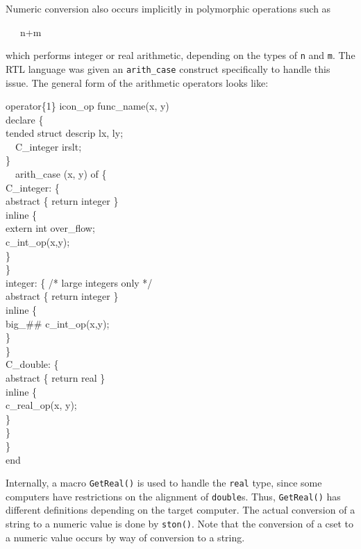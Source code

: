Numeric conversion also occurs implicitly in polymorphic operations such as

{\ttfamily\mdseries
\ \ \ n+m}

\noindent which performs integer or real arithmetic, depending on the
types of \texttt{n} and \texttt{m}. The RTL language was given an
\texttt{arith\_case} construct specifically to handle this issue. The
general form of the arithmetic operators looks like:


\begin{iconcode}
\>operator\{1\} icon\_op func\_name(x, y)\\
\>\>declare \{\\
\>\>\>tended struct descrip lx, ly;\\
\ \  C\_integer irslt;\\
\>\>\>\}\\
\>\ \ arith\_case (x, y) of \{\\
\>\>\>C\_integer: \{\\
\>\>\>\>abstract \{ return integer \}\\
\>\>\>\>inline \{\\
\>\>\>\>\>extern int over\_flow;\\
\>\>\>\>\>c\_int\_op(x,y);\\
\>\>\>\>\>\}\\
\>\>\>\>\}\\
\>\>\>integer: \{ /* large integers only */\\
\>\>\>\>abstract \{ return integer \}\\
\>\>\>\>inline \{\\
\>\>\>\>\>big\_\#\# c\_int\_op(x,y);\\
\>\>\>\>\>\}\\
\>\>\>\>\}\\
\>\>\>C\_double: \{\\
\>\>\>\>abstract \{ return real \}\\
\>\>\>\>inline \{\\
\>\>\>\>\>c\_real\_op(x, y);\\
\>\>\>\>\>\}\\
\>\>\>\>\}\\
\>\>\>\}\\
\>end
\end{iconcode}

Internally, a macro \texttt{GetReal()} is used to handle the \texttt{real}
type, since some computers have restrictions on the alignment of
\texttt{double}s. Thus, \texttt{GetReal()} has different definitions depending
on the target computer. The actual conversion of a string to a numeric
value is done by \texttt{ston()}. Note that the conversion of a cset
to a numeric value occurs by way of conversion to a string.

